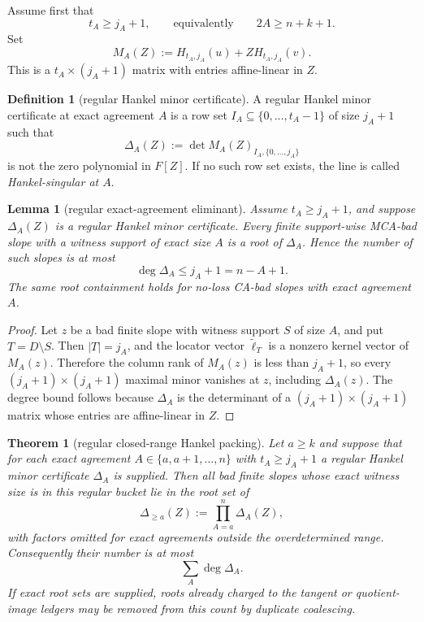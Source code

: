 \documentclass[11pt]{article}
\newtheorem{theorem}{Theorem}[section]
\newtheorem{lemma}[lemma]{Lemma}
\theoremstyle{definition}
\newtheorem{definition}[definition]{Definition}
\theoremstyle{remark}
\begin{document}
Assume first that
\[
        t_A\ge j_A+1,
        \qquad\text{equivalently}\qquad
        2A\ge n+k+1 .
\]
Set
\[
        M_A(Z):=H_{t_A,j_A}(u)+Z H_{t_A,j_A}(v).
\]
This is a $t_A\times(j_A+1)$ matrix with entries affine-linear in $Z$.

\begin{definition}[regular Hankel minor certificate]
\label{def:hankel-regularity-certificate}
A regular Hankel minor certificate at exact agreement $A$ is a row set
$I_A\subseteq\{0,\ldots,t_A-1\}$ of size $j_A+1$ such that
\[
        \Delta_A(Z)
        :=\det M_A(Z)_{I_A,\{0,\ldots,j_A\}}
\]
is not the zero polynomial in $F[Z]$.  If no such row set exists, the line is
called \emph{Hankel-singular at $A$}.
\end{definition}

\begin{lemma}[regular exact-agreement eliminant]
\label{lem:regular-exact-agreement-eliminant}
Assume $t_A\ge j_A+1$, and suppose $\Delta_A(Z)$ is a regular Hankel minor
certificate.  Every finite support-wise MCA-bad slope with a witness support of
exact size $A$ is a root of $\Delta_A$.  Hence the number of such slopes is at
most
\[
        \deg\Delta_A\le j_A+1=n-A+1 .
\]
The same root containment holds for no-loss CA-bad slopes with exact agreement
$A$.
\end{lemma}

\begin{proof}
Let $z$ be a bad finite slope with witness support $S$ of size $A$, and put
$T=D\setminus S$.  Then $|T|=j_A$, and the locator vector
$\widetilde\ell_T$ is a nonzero kernel vector of $M_A(z)$.  Therefore the column
rank of $M_A(z)$ is less than $j_A+1$, so every $(j_A+1)\times(j_A+1)$ maximal
minor vanishes at $z$, including $\Delta_A(z)$.  The degree bound follows because
$\Delta_A$ is the determinant of a $(j_A+1)\times(j_A+1)$ matrix whose entries
are affine-linear in $Z$.
\end{proof}

\begin{theorem}[regular closed-range Hankel packing]
\label{thm:regular-closed-ball-hankel-packing}
Let $a\ge k$ and suppose that for each exact agreement
$A\in\{a,a+1,\ldots,n\}$ with $t_A\ge j_A+1$ a regular Hankel minor certificate
$\Delta_A$ is supplied.  Then all bad finite slopes whose exact witness size is
in this regular bucket lie in the root set of
\[
        \Delta_{\ge a}(Z):=\prod_{A=a}^{n}\Delta_A(Z),
\]
with factors omitted for exact agreements outside the overdetermined range.
Consequently their number is at most
\[
        \sum_A \deg\Delta_A .
\]
If exact root sets are supplied, roots already charged to the tangent or
quotient-image ledgers may be removed from this count by duplicate coalescing.
\end{theorem}
\end{document}
